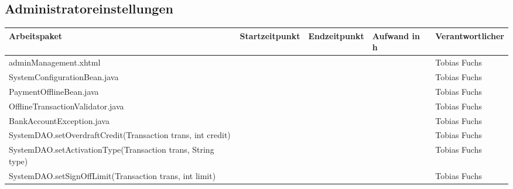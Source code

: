 \begin{landscape}
	\subsection{Administratoreinstellungen}
	\begin{tabular}{|p{10cm}|p{4cm}|p{3cm}|p{3cm}|p{3cm}|}
		\hline  \textbf{Arbeitspaket} & \textbf{Startzeitpunkt} & \textbf{Endzeitpunkt} & \textbf{Aufwand in h} & \textbf{Verantwortlicher} \\ 
		\hline   adminManagement.xhtml                                 &                            &                             &                     & Tobias Fuchs\\
		\hline   SystemConfigurationBean.java                          &                            &                             &                     & Tobias Fuchs\\
		\hline   PaymentOfflineBean.java                               &                            &                             &                     & Tobias Fuchs \\
		\hline   OfflineTransactionValidator.java                      &                            &                             &                     & Tobias Fuchs\\
		\hline   BankAccountException.java                             &                            &                             &                     & Tobias Fuchs\\
		\hline   SystemDAO.setOverdraftCredit(Transaction trans, int credit)                  &                            &                             &                     & Tobias Fuchs\\
		\hline   SystemDAO.setActivationType(Transaction trans, String type)                  &                            &                             &                     & Tobias Fuchs\\
		\hline   SystemDAO.setSignOffLimit(Transaction trans, int limit)                      &                            &                             &                     & Tobias Fuchs\\
		\hline 
	\end{tabular} \ \\
	\ \\
	

\end{landscape}
